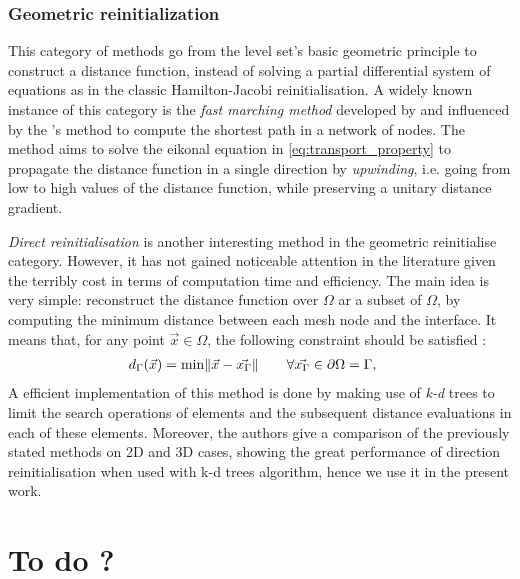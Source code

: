 \subsubsection{Geometric reinitialization}
%
This category of methods go from the level set's basic geometric principle to construct a distance function,
instead of solving a partial differential system of equations as in the classic Hamilton-Jacobi reinitialisation.
A widely known instance of this category is the \emph{fast marching method} developed by \citet{sethian_fast_1996}
and influenced by the \citet{dijkstra_note_1959}'s method to compute the shortest path in a network of nodes. 
The method aims to solve the eikonal equation in \cref{eq:transport_property} to propagate the distance function in a 
single direction by \emph{upwinding}, i.e. going from low to high values of the distance function, 
while preserving a unitary distance gradient.

\emph{Direct reinitialisation} is another interesting method in the geometric reinitialise category. However,
it has not gained noticeable attention in the literature given the terribly cost in terms of computation time and efficiency.
The main idea is very simple: reconstruct the distance function over $\Omega$ ar a subset of $\Omega$, by computing the 
minimum distance between each mesh node and the interface. It means that, for any point $\vec{x} \in \Omega$, the following 
constraint should be satisfied \citet{osher_signed_2003}:
\begin{align}
\label{eq:min_distance}
& d_\Gamma(\vec{x}) = \min \lVert \vec{x}-\vec{x_\Gamma} \rVert \qquad \forall \vec{x_\Gamma} \in \partial \Omega = \Gamma,
\end{align}
A efficient implementation of this method is done by \citet{shakoor_efficient_2015} making use of \emph{k-d} trees
to limit the search operations of elements and the subsequent distance evaluations in each of these elements.
Moreover, the authors give a comparison of the previously stated methods on 2D and 3D cases, showing the great 
performance of direction reinitialisation when used with k-d trees algorithm, hence we use it in the present work.
%
\section*{To do ?}

















